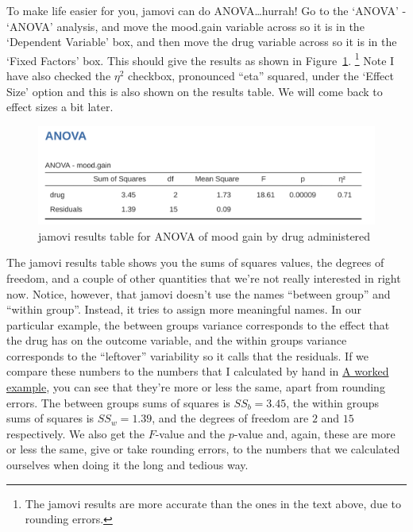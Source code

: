 \documentclass[
  a4paper,
]{book}
\begin{document}
To make life easier for you, jamovi can do ANOVA\ldots hurrah! Go to the
`ANOVA' - `ANOVA' analysis, and move the mood.gain variable across so it
is in the `Dependent Variable' box, and then move the drug variable
across so it is in the `Fixed Factors' box. This should give the results
as shown in Figure~\ref{fig-fig13-3}. \footnote{The jamovi results are
  more accurate than the ones in the text above, due to rounding errors.}
Note I have also checked the \(\eta^2\) checkbox, pronounced ``eta''
squared, under the `Effect Size' option and this is also shown on the
results table. We will come back to effect sizes a bit later.

\begin{figure}

\includegraphics[width=1\textwidth,height=\textheight]{images/fig13-3.png} \hfill{}

\caption{\label{fig-fig13-3}jamovi results table for ANOVA of mood gain
by drug administered}

\end{figure}

The jamovi results table shows you the sums of squares values, the
degrees of freedom, and a couple of other quantities that we're not
really interested in right now. Notice, however, that jamovi doesn't use
the names ``between group'' and ``within group''. Instead, it tries to
assign more meaningful names. In our particular example, the between
groups variance corresponds to the effect that the drug has on the
outcome variable, and the within groups variance corresponds to the
``leftover'' variability so it calls that the residuals. If we compare
these numbers to the numbers that I calculated by hand in
\protect\hyperlink{a-worked-example}{A worked example}, you can see that
they're more or less the same, apart from rounding errors. The between
groups sums of squares is \(SS_b = 3.45\), the within groups sums of
squares is \(SS_w = 1.39\), and the degrees of freedom are \(2\) and
\(15\) respectively. We also get the \(F\)-value and the \(p\)-value
and, again, these are more or less the same, give or take rounding
errors, to the numbers that we calculated ourselves when doing it the
long and tedious way.
\end{document}
